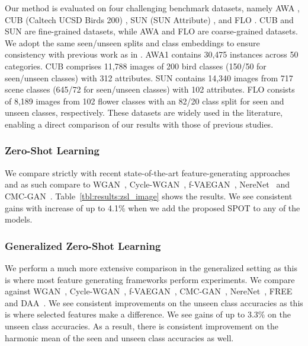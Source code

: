 \documentclass[10pt,twocolumn,letterpaper]{article}
\begin{document}
Our method is evaluated on four challenging benchmark datasets, namely AWA \cite{lampert2013attribute}, CUB (Caltech UCSD Birds 200) \cite{cub}, SUN (SUN Attribute) \cite{sun}, and FLO \cite{nilsback2008automated}. CUB and SUN are fine-grained datasets, while AWA and FLO are coarse-grained datasets.  We adopt the same seen/unseen splits and class embeddings to ensure consistency with previous work as in \cite{xian2017zero}. AWA1 contains 30,475 instances across 50 categories. CUB comprises 11,788 images of 200 bird classes (150/50 for seen/unseen classes) with 312 attributes. SUN contains 14,340 images from 717 scene classes (645/72 for seen/unseen classes) with 102 attributes. FLO consists of 8,189 images from 102 flower classes with an 82/20 class split for seen and unseen classes, respectively. These datasets are widely used in the literature, enabling a direct comparison of our results with those of previous studies.



\subsubsection{Zero-Shot Learning}

We compare strictly with recent state-of-the-art feature-generating approaches and as such compare to WGAN~\cite{clswgan}, Cycle-WGAN~\cite{cyclewgan}, f-VAEGAN~\cite{fvaegan}, NereNet~\cite{nerenet} and CMC-GAN~\cite{cmcnet}. Table~\ref{tbl:results:zsl_image} shows the results. We see consistent gains with increase of up to 4.1\% when we add the proposed SPOT to any of the models.



\subsubsection{Generalized Zero-Shot Learning}

We perform a much more extensive comparison in the generalized setting as this is where most feature generating frameworks perform experiments. We compare against WGAN~\cite{clswgan}, Cycle-WGAN~\cite{cyclewgan}, f-VAEGAN~\cite{fvaegan}, CMC-GAN~\cite{cmcnet}, NereNet~\cite{nerenet}, FREE~\cite{free} and DAA~\cite{daa}. We see consistent improvements on the unseen class accuracies as this is where selected features make a difference. We see gains of up to 3.3\% on the unseen class accuracies. As a result, there is consistent improvement on the harmonic mean of the seen and unseen class accuracies as well.
\end{document}
